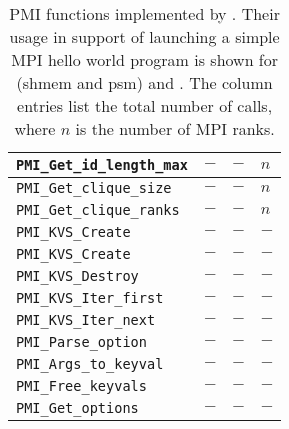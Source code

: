 \begin{table}
\begin{tabular}{|p{5cm}|p{3.5cm}|p{3cm}|p{3cm}|}
\hline
{\tt  PMI\_Get\_id\_length\_max} & $-$ & $-$ & $n$ \\
\hline
{\tt  PMI\_Get\_clique\_size} & $-$ & $-$ & $n$ \\
\hline
{\tt  PMI\_Get\_clique\_ranks} & $-$ & $-$ & $n$ \\
\hline
{\tt  PMI\_KVS\_Create} & $-$ & $-$ & $-$ \\
\hline
{\tt  PMI\_KVS\_Create} & $-$ & $-$ & $-$ \\
\hline
{\tt  PMI\_KVS\_Destroy} & $-$ & $-$ & $-$ \\
\hline
{\tt  PMI\_KVS\_Iter\_first} & $-$ & $-$ & $-$ \\
\hline
{\tt  PMI\_KVS\_Iter\_next} & $-$ & $-$ & $-$ \\
\hline
{\tt  PMI\_Parse\_option} & $-$ & $-$ & $-$ \\
\hline
{\tt  PMI\_Args\_to\_keyval} & $-$ & $-$ & $-$ \\
\hline
{\tt  PMI\_Free\_keyvals} & $-$ & $-$ & $-$ \\
\hline
{\tt  PMI\_Get\_options} & $-$ & $-$ & $-$\\
\hline
\end{tabular}
\caption{PMI functions implemented by \slurm.
Their usage in support of launching a simple MPI hello world program
is shown for  (shmem and psm) and \openmpi.
The column entries list the total number of calls, where $n$ is the
number of MPI ranks.}
\label{tab:pmiv1}
\end{table}
